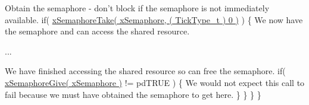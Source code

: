 \begin{DoxyPre}Obtain the semaphore - don't block if the semaphore is not
immediately available.
        if( \hyperlink{semphr_8h_af116e436d2a5ae5bd72dbade2b5ea930}{xSemaphoreTake( xSemaphore, ( TickType\_t ) 0 )} )
        \{
We now have the semaphore and can access the shared resource.\end{DoxyPre}



\begin{DoxyPre}...\end{DoxyPre}



\begin{DoxyPre}We have finished accessing the shared resource so can free the
semaphore.
            if( \hyperlink{semphr_8h_aae55761cabfa9bf85c8f4430f78c0953}{xSemaphoreGive( xSemaphore )} != pdTRUE )
            \{
We would not expect this call to fail because we must have
obtained the semaphore to get here.
            \}
        \}
    \}
 \}
 \end{DoxyPre}
 